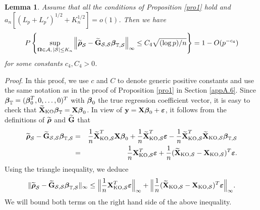 \documentclass[11pt]{article}
\newtheorem{lemma}{Lemma}%
\newcommand{\by}{\mbox{\bf y}}
\newcommand{\bG}{\mbox{\bf G}}
\newcommand{\bX}{\mbox{\bf X}}
\newcommand{\bveps}{\mbox{\boldmath $\varepsilon$}}
\newcommand{\bbeta}{\mbox{\boldmath $\beta$}}
\newcommand{\brho}{\mbox{\boldmath $\rho$}}
\newcommand{\wt}{\widetilde}
\newcommand{\calA}{{\cal A}}
\newcommand{\sbOmg}{\mbox{\scriptsize\boldmath $\Omega$}}
\begin{document}
\begin{lemma}\label{lem: beta-est}
Assume that all the conditions of Proposition \ref{pro1} hold and $a_n [(L_p+L_p')^{1/2}+K_n^{1/2}] = o(1)$. Then we have
	\begin{align*}
	P\left\{\sup_{\sbOmg \in \calA, \, |\mathcal{S}|\leq K_n}\left\| \widetilde{\brho}_\mathcal{S}-\widetilde{\bG}_{\mathcal{S},\mathcal{S}}\bbeta_{\mathbb{T},\mathcal{S}}\right\|_\infty \leq C_4\sqrt{(\log p)/n}\right\} = 1 - O(p^{-c_4})
	\end{align*}
for some constants $c_4, C_4>0$.
\end{lemma}

\noindent \textit{Proof}. In this proof, we use $c$ and $C$ to denote generic positive constants and use the same notation as in the proof of Proposition \ref{pro1} in Section \ref{appA.6}. Since $\bbeta_{\mathbb{T}}=(\bbeta_0^T, 0,\ldots,0)^T$ with $\bbeta_0$ the true regression coefficient vector,  it is easy to check that $\wt{\bX}_{\rm KO}\bbeta_{\mathbb{T}}=\bX\bbeta_0$. In view of $\by = \bX\bbeta_0 + \bveps$, it follows from the definitions of $\widetilde{\brho}$  and $\widetilde{\bG}$ that
	\begin{eqnarray*}
		\widetilde{\brho}_\mathcal{S}-\widetilde{\bG}_{\mathcal{S},\mathcal{S}}\bbeta_{\mathbb{T},\mathcal{S}}%
		&=&\frac{1}{n}\wt{\bX}_{\rm KO, \mathcal{S}}^T\bX\bbeta_0+\frac{1}{n}\wt{\bX}_{\rm KO, \mathcal{S}}^T\bveps-\dfrac{1}{n}\wt{\bX}_{\rm KO, \mathcal{S}}^{T}\wt{\bX}_{\rm KO, \mathcal{S}}\bbeta_{\mathbb{T},\mathcal{S}}\\
		&=&\frac{1}{n}{\bX}_{\rm KO, \mathcal{S}}^T\bveps+\frac{1}{n}(\wt{\bX}_{\rm KO, \mathcal{S}}-{\bX}_{\rm KO, \mathcal{S}})^T\bveps.
	\end{eqnarray*}
	Using the triangle inequality, we deduce
	\begin{eqnarray*}
		\|\widetilde{\brho}_\mathcal{S}-\widetilde{\bG}_{\mathcal{S},\mathcal{S}}\bbeta_{\mathbb{T},\mathcal{S}}\|_{\infty}\le \Big\|\frac{1}{n}{\bX}_{\rm KO, \mathcal{S}}^T\bveps\Big\|_{\infty}+\Big\|\frac{1}{n}(\wt{\bX}_{\rm KO, \mathcal{S}}-{\bX}_{\rm KO, \mathcal{S}})^T\bveps\Big\|_{\infty}.
	\end{eqnarray*}
We will bound both terms on the right hand side of the above inequality.
\end{document}
